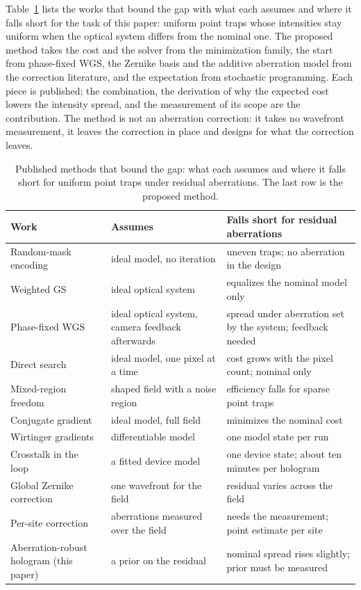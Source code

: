 Table~\ref{tab:related} lists the works that bound the gap with what each assumes and where it falls short for the task of this paper: uniform point traps whose intensities stay uniform when the optical system differs from the nominal one. The proposed
method takes the cost and the solver from the minimization family, the start from phase-fixed WGS, the Zernike basis and the additive aberration model from the correction literature, and the expectation from stochastic programming. Each piece is published; the
combination, the derivation of why the expected cost lowers the intensity spread, and the measurement of its scope are the contribution. The method is not an aberration correction: it takes no wavefront measurement, it leaves the correction in place and designs for what the
correction leaves.

\begin{table}[t]
\centering\small
\caption{Published methods that bound the gap: what each assumes and where it falls short for uniform point traps under residual aberrations. The last row is the proposed method.}
\label{tab:related}
\begin{tabular}{@{}p{3.6cm} p{4.4cm} p{6.0cm}@{}}
\toprule
Work & Assumes & Falls short for residual aberrations\\
\midrule
Random-mask encoding~\cite{montes2006} & ideal model, no iteration & uneven traps; no aberration in the design\\
Weighted GS~\cite{dileonardo2007} & ideal optical system & equalizes the nominal model only\\
Phase-fixed WGS~\cite{kim2019} & ideal optical system, camera feedback afterwards & spread under aberration set by the system; feedback needed\\
Direct search~\cite{polin2005} & ideal model, one pixel at a time & cost grows with the pixel count; nominal only\\
Mixed-region freedom~\cite{pasienski2008} & shaped field with a noise region & efficiency falls for sparse point traps\\
Conjugate gradient~\cite{harte2014,bowman2017} & ideal model, full field & minimizes the nominal cost\\
Wirtinger gradients~\cite{chakravarthula2019} & differentiable model & one model state per run\\
Crosstalk in the loop~\cite{schroff2023,persson2012} & a fitted device model & one device state; about ten minutes per hologram~\cite{schroff2023}\\
Global Zernike correction~\cite{nogrette2014,ebadi2021,manetsch2025} & one wavefront for the field & residual varies across the field\\
Per-site correction~\cite{machu2025,christen2025} & aberrations measured over the field & needs the measurement; point estimate per site\\
Aberration-robust hologram (this paper) & a prior on the residual & nominal spread rises slightly; prior must be measured\\
\bottomrule
\end{tabular}
\end{table}
